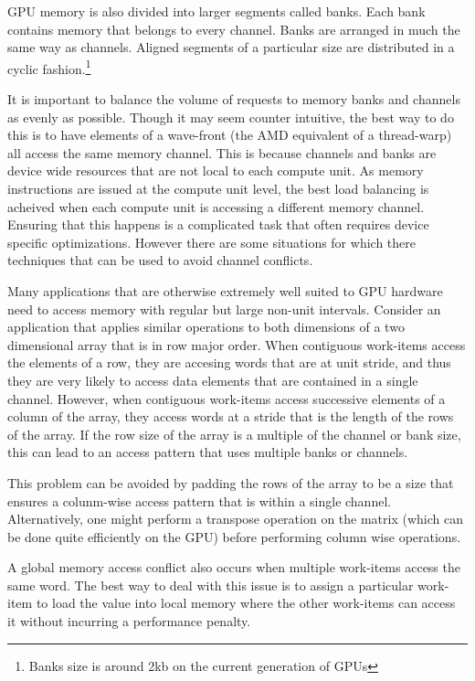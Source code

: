 \documentclass[12pt,twoside]{reedthesis}
\begin{document}
GPU memory is also divided into larger segments called banks. Each bank contains memory that belongs to every channel. Banks are arranged in much the same way as channels. Aligned segments of a particular size are distributed in a cyclic fashion.\footnote{Banks size is around 2kb on the current generation of GPUs}

It is important to balance the volume of requests to memory banks and channels as evenly as possible. Though it may seem counter intuitive, the best way to do this is to have elements of a wave-front (the AMD equivalent of a thread-warp) all access the same memory channel. This is because channels and banks are device wide resources that are not local to each compute unit. As memory instructions are issued at the compute unit level, the best load balancing is acheived when each compute unit is accessing a different memory channel. Ensuring that this happens is a complicated task that often requires device specific optimizations. However there are some situations for which there techniques that can be used to avoid channel conflicts.

Many applications that are otherwise extremely well suited to GPU hardware need to access memory with regular but large non-unit intervals. Consider an application that applies similar operations to both dimensions of a two dimensional array that is in row major order. When contiguous work-items access the elements of a row, they are accesing words that are at unit stride, and thus they are very likely to access data elements that are contained in a single channel. However, when contiguous work-items access successive elements of a column of the array, they access words at a stride that is the length of the rows of the array. If the row size of the array is a multiple of the channel or bank size, this can lead to an access pattern that uses multiple banks or channels.

This problem can be avoided by padding the rows of the array to be a size that ensures a colunm-wise access pattern that is within a single channel. Alternatively, one might perform a transpose operation on the matrix (which can be done quite efficiently on the GPU) before performing column wise operations.

A global memory access conflict also occurs when multiple work-items access the same word. The best way to deal with this issue is to assign a particular work-item to load the value into local memory where the other work-items can access it without incurring a performance penalty.
\end{document}
